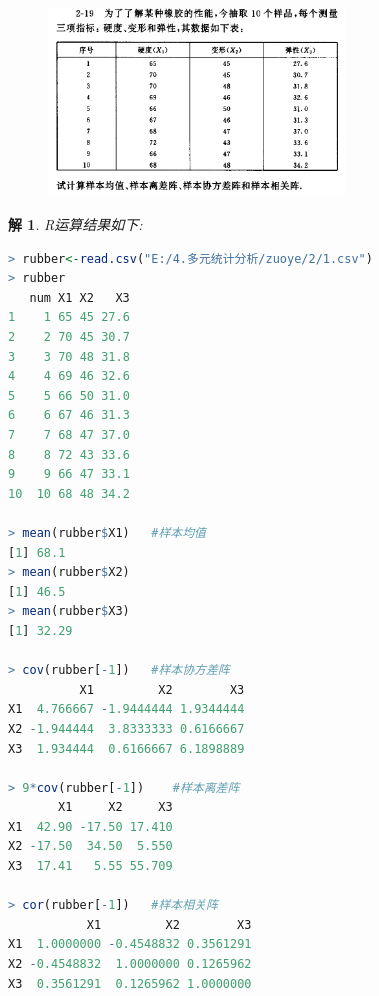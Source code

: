 \documentclass[11pt,a4paper]{ctexart}
\newtheorem*{solution}{解}
\begin{document}
\begin{figure}[H]
	\includegraphics[width=0.7\textwidth]{5.png}
\end{figure}
\begin{solution}
R运算结果如下:
\end{solution}
\begin{lstlisting}[language=r]
> rubber<-read.csv("E:/4.多元统计分析/zuoye/2/1.csv")
> rubber
   num X1 X2   X3
1    1 65 45 27.6
2    2 70 45 30.7
3    3 70 48 31.8
4    4 69 46 32.6
5    5 66 50 31.0
6    6 67 46 31.3
7    7 68 47 37.0
8    8 72 43 33.6
9    9 66 47 33.1
10  10 68 48 34.2

> mean(rubber$X1)   #样本均值
[1] 68.1
> mean(rubber$X2)
[1] 46.5
> mean(rubber$X3)
[1] 32.29

> cov(rubber[-1])   #样本协方差阵
          X1         X2        X3
X1  4.766667 -1.9444444 1.9344444
X2 -1.944444  3.8333333 0.6166667
X3  1.934444  0.6166667 6.1898889

> 9*cov(rubber[-1])    #样本离差阵
       X1     X2     X3
X1  42.90 -17.50 17.410
X2 -17.50  34.50  5.550
X3  17.41   5.55 55.709

> cor(rubber[-1])   #样本相关阵
           X1         X2        X3
X1  1.0000000 -0.4548832 0.3561291
X2 -0.4548832  1.0000000 0.1265962
X3  0.3561291  0.1265962 1.0000000

\end{lstlisting}
\end{document}
